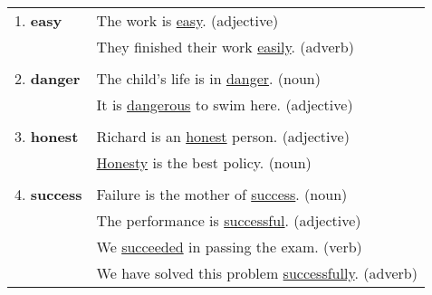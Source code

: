 \begin{tabular}{ll}
    1. \textbf{easy} & The work is \underline{easy}. (adjective) \\
    & They finished their work \underline{easily}. (adverb) \\ \\
    2. \textbf{danger} & The child's life is in \underline{danger}. (noun) \\
    & It is \underline{dangerous} to swim here. (adjective) \\ \\
    3. \textbf{honest} & Richard is an \underline{honest} person. (adjective) \\
    & \underline{Honesty} is the best policy. (noun) \\ \\
    4. \textbf{success} & Failure is the mother of \underline{success}. (noun) \\
    & The performance is \underline{successful}. (adjective) \\
    & We \underline{succeeded} in passing the exam. (verb) \\
    & We have solved this problem \underline{successfully}. (adverb)
\end{tabular}
